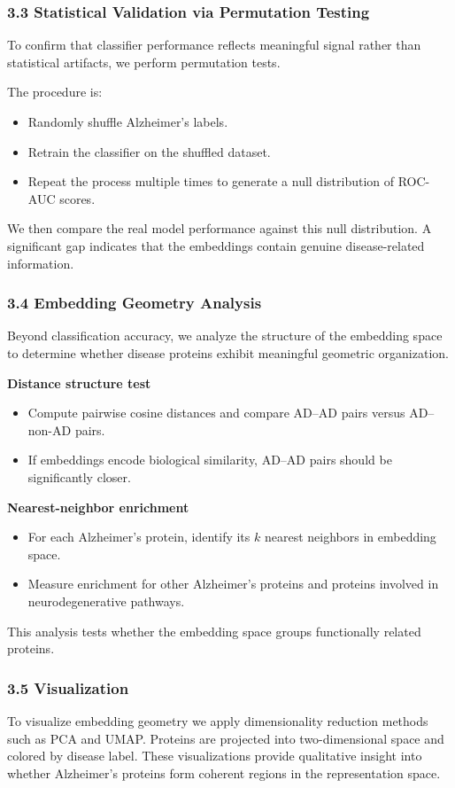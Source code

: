 \documentclass{article}
\begin{document}
\subsubsection*{3.3 Statistical Validation via Permutation Testing}
To confirm that classifier performance reflects meaningful signal rather than statistical artifacts, we perform permutation tests.

The procedure is:
\begin{itemize}
    \item Randomly shuffle Alzheimer's labels.
    \item Retrain the classifier on the shuffled dataset.
    \item Repeat the process multiple times to generate a null distribution of ROC-AUC scores.
\end{itemize}

We then compare the real model performance against this null distribution. A significant gap indicates that the embeddings contain genuine disease-related information.

\subsubsection*{3.4 Embedding Geometry Analysis}
Beyond classification accuracy, we analyze the structure of the embedding space to determine whether disease proteins exhibit meaningful geometric organization.

\textbf{Distance structure test}
\begin{itemize}
    \item Compute pairwise cosine distances and compare AD--AD pairs versus AD--non-AD pairs.
    \item If embeddings encode biological similarity, AD--AD pairs should be significantly closer.
\end{itemize}

\textbf{Nearest-neighbor enrichment}
\begin{itemize}
    \item For each Alzheimer's protein, identify its $k$ nearest neighbors in embedding space.
    \item Measure enrichment for other Alzheimer's proteins and proteins involved in neurodegenerative pathways.
\end{itemize}
This analysis tests whether the embedding space groups functionally related proteins.

\subsubsection*{3.5 Visualization}
To visualize embedding geometry we apply dimensionality reduction methods such as PCA and UMAP. Proteins are projected into two-dimensional space and colored by disease label. These visualizations provide qualitative insight into whether Alzheimer's proteins form coherent regions in the representation space.
\end{document}
